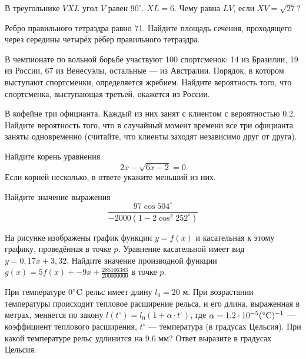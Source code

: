 \documentclass[twocolumn]{article}
\begin{document}
\cleardoublepage
\def\examvart{Вариант 19.1}
\normalsize

\startpartone
\large




\begin{taskBN}{1}
В треугольнике $VXL$ угол $V$ равен $90^\circ$.  $XL=6$. Чему равна  $LV$, если $XV=\sqrt{27}$? 
\end{taskBN}

\begin{taskBN}{2}
Ребро правильного тетраэдра равно 71. Найдите площадь сечения, проходящего через середины четырёх рёбер правильного тетраэдра.
\end{taskBN}

\begin{taskBN}{3}
В чемпионате по вольной борьбе участвуют 100 спортсменок: 14 из Бразилии, 19 из России, 67 из Венесуэлы, остальные — из Австралии. Порядок, в котором выступают спортсменки, определяется жребием. Найдите вероятность того, что спортсменка, выступающая третьей, окажется из России.
\end{taskBN}

\begin{taskBN}{4}
В кофейне три официанта. Каждый из них занят с клиентом с вероятностью 0.2. Найдите вероятность того, что в случайный момент времени все три официанта заняты одновременно (считайте, что клиенты заходят независимо друг от друга).
\end{taskBN}

\begin{taskBN}{5}
Найдите корень уравнения $$2x-\sqrt{6x-2}=0$$ Если корней несколько, в ответе укажите меньший из них.
\end{taskBN}

\begin{taskBN}{6}
Найдите значение выражения $$\frac{97\cos504^\circ}{-2000(1-2\cos^2{252^\circ})}$$
\end{taskBN}

\begin{taskBN}{7}
На рисунке изображены график функции $y=f(x)$ и касательная к этому графику, проведённая в точке $p$. Уравнение касательной имеет вид $y= 0{,}17  x+ 3{,}32 $. Найдите значение производной функции $g(x) =  5 f(x)+ -9 x+\frac{285106383}{200000000}$ в точке $p$.\vspace{2.5cm}
\end{taskBN}

\begin{taskBN}{8}
При температуре $0^\circ {\rm{C}}$ рельс имеет длину $l_0=20$ м. При возрастании температуры происходит тепловое расширение рельса, и его длина, выраженная в метрах, меняется по закону $l(t^\circ ) = l_0 (1 + \alpha  \cdot t^\circ)$, где $\alpha=1.2\cdot 10^{-5}(^\circ {\rm{C}})^{-1}$ — коэффициент теплового расширения, $t^\circ$  — температура (в градусах Цельсия). При какой температуре рельс удлинится на 9.6 мм? Ответ выразите в градусах Цельсия.
\end{taskBN}
\end{document}
